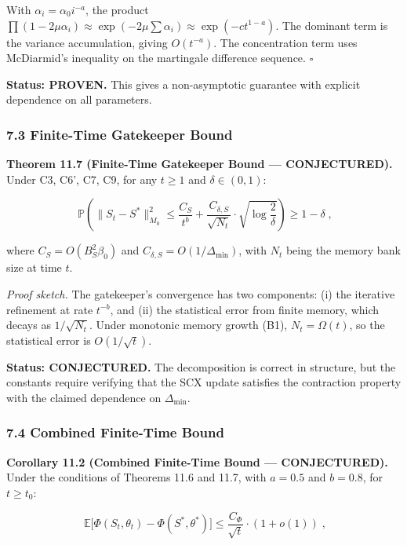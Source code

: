\documentclass[
  12pt,
]{ctexart}
\begin{document}
With \(\alpha_i = \alpha_0 i^{-a}\), the product
\(\prod (1 - 2\mu\alpha_i) \approx \exp(-2\mu \sum \alpha_i) \approx \exp(-c t^{1-a})\).
The dominant term is the variance accumulation, giving \(O(t^{-a})\).
The concentration term uses McDiarmid's inequality on the martingale
difference sequence. \(\square\)

\textbf{Status: PROVEN.} This gives a non-asymptotic guarantee with
explicit dependence on all parameters.

\subsubsection{7.3 Finite-Time Gatekeeper
Bound}\label{finite-time-gatekeeper-bound}

\textbf{Theorem 11.7 (Finite-Time Gatekeeper Bound --- CONJECTURED).}
Under C3, C6', C7, C9, for any \(t \geq 1\) and \(\delta \in (0, 1)\):

\[\boxed{\;\mathbb{P}\!\left(\|S_t - S^*\|_{M_0}^2 \leq \frac{C_S}{t^{b}} + \frac{C_{\delta,S}}{\sqrt{N_t}} \cdot \sqrt{\log\frac{2}{\delta}}\right) \geq 1 - \delta\;},\]

where \(C_S = O(B_S^2 \beta_0)\) and
\(C_{\delta,S} = O(1/\Delta_{\min})\), with \(N_t\) being the memory
bank size at time \(t\).

\emph{Proof sketch.} The gatekeeper's convergence has two components:
(i) the iterative refinement at rate \(t^{-b}\), and (ii) the
statistical error from finite memory, which decays as \(1/\sqrt{N_t}\).
Under monotonic memory growth (B1), \(N_t = \Omega(t)\), so the
statistical error is \(O(1/\sqrt{t})\).

\textbf{Status: CONJECTURED.} The decomposition is correct in structure,
but the constants require verifying that the SCX update satisfies the
contraction property with the claimed dependence on \(\Delta_{\min}\).

\subsubsection{7.4 Combined Finite-Time
Bound}\label{combined-finite-time-bound}

\textbf{Corollary 11.2 (Combined Finite-Time Bound --- CONJECTURED).}
Under the conditions of Theorems 11.6 and 11.7, with \(a = 0.5\) and
\(b = 0.8\), for \(t \geq t_0\):

\[\boxed{\;\mathbb{E}\bigl[\Phi(S_t, \theta_t) - \Phi(S^*, \theta^*)\bigr] \leq \frac{C_\Phi}{\sqrt{t}} \cdot (1 + o(1))\;},\]
\end{document}
